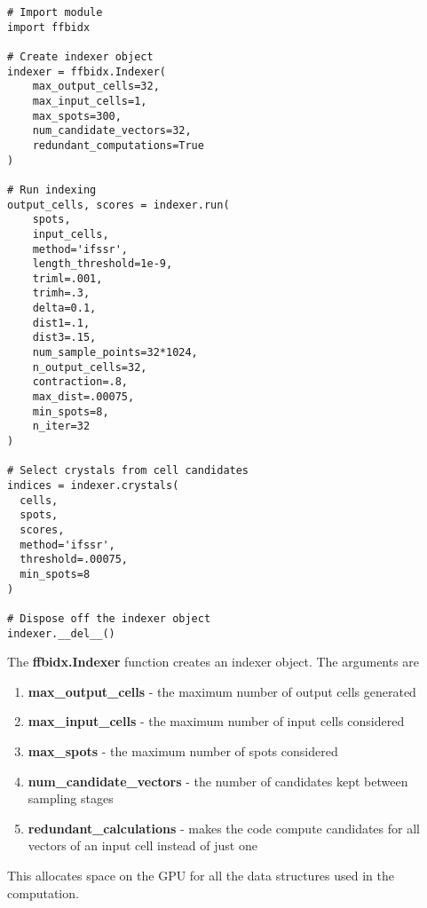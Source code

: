 \documentclass[a4paper,10pt]{article}
\begin{document}
\begin{lstlisting}
# Import module
import ffbidx

# Create indexer object
indexer = ffbidx.Indexer(
    max_output_cells=32,
    max_input_cells=1,
    max_spots=300,
    num_candidate_vectors=32,
    redundant_computations=True
)

# Run indexing
output_cells, scores = indexer.run(
    spots,
    input_cells,
    method='ifssr',
    length_threshold=1e-9,
    triml=.001,
    trimh=.3,
    delta=0.1,
    dist1=.1,
    dist3=.15,
    num_sample_points=32*1024,
    n_output_cells=32,
    contraction=.8,
    max_dist=.00075,
    min_spots=8,
    n_iter=32
)

# Select crystals from cell candidates
indices = indexer.crystals(
  cells,
  spots,
  scores,
  method='ifssr',
  threshold=.00075,
  min_spots=8
)

# Dispose off the indexer object
indexer.__del__()
\end{lstlisting}
%
The \textbf{ffbidx.Indexer} function creates an indexer object. The arguments are
%
\begin{enumerate}
 \item \textbf{max\_output\_cells} - the maximum number of output cells generated
 \item \textbf{max\_input\_cells} - the maximum number of input cells considered
 \item \textbf{max\_spots} - the maximum number of spots considered
 \item \textbf{num\_candidate\_vectors} - the number of candidates kept between sampling stages
 \item \textbf{redundant\_calculations} - makes the code compute candidates for all vectors of an input cell instead of just one
\end{enumerate}
%
This allocates space on the GPU for all the data structures used in the computation.
\end{document}
